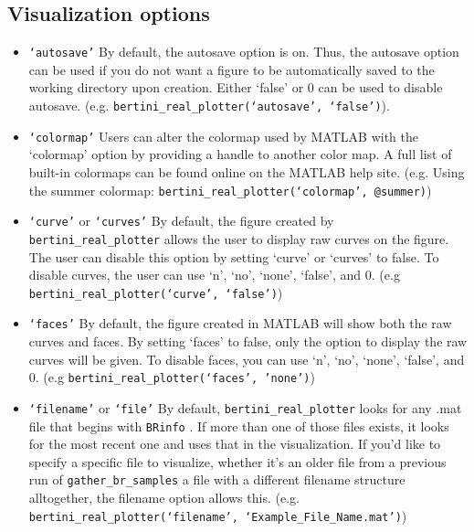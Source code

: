 \documentclass[10pt]{article}
\begin{document}
\subsection{Visualization options}
\begin{itemize}

\item \texttt{`autosave'} \newline
By default, the autosave option is on. Thus, the autosave option can be used if you do not want a figure to be automatically saved to the working directory upon creation. Either `false' or 0 can be used to disable autosave. (e.g. \texttt{bertini\_real\_plotter(`autosave', `false')}).

\item \texttt{`colormap'} \newline
Users can alter the colormap used by MATLAB with the `colormap' option by providing a handle to another color map. A full list of built-in colormaps can be found online on the MATLAB help site. \newline (e.g. Using the summer colormap: \texttt{bertini\_real\_plotter(`colormap', @summer)})

\item \texttt{`curve'} or \texttt{`curves'} \newline
By default, the figure created by \texttt{bertini\_real\_plotter} allows the user to display raw curves on the figure. The user can disable this option by setting `curve'  or `curves' to false. To disable curves, the user can use `n', `no', `none', `false', and 0. \newline (e.g \texttt{bertini\_real\_plotter(`curve', `false')})

\item \texttt{`faces'} \newline
By default, the figure created in MATLAB will show both the raw curves and faces. By setting `faces' to false, only the option to display the raw curves will be given. To disable faces, you can use `n', `no', `none', `false', and 0. \newline (e.g \texttt{bertini\_real\_plotter(`faces', 'none')})

\item \texttt{`filename'} or \texttt{`file'} \newline
By default, \texttt{bertini\_real\_plotter} looks for any .mat file that begins with \texttt{BRinfo} . If more than one of those files exists, it looks for the most recent one and uses that in the visualization. If you'd like to specify a specific file to visualize, whether it's an older file from a previous run of \texttt{gather\_br\_samples} a file with a different filename structure alltogether, the filename option allows this. \newline (e.g. \texttt{bertini\_real\_plotter(`filename', `Example\_File\_Name.mat')})


\end{itemize}
\end{document}
